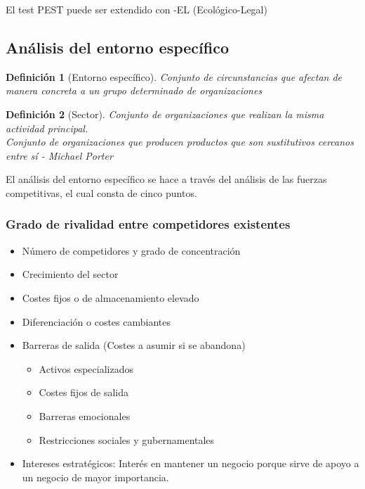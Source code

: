 \documentclass[12pt]{article}
\theoremstyle{definition_wo_parentheses}
\newtheorem{definicion}{Definición}[section]
\begin{document}
El test PEST puede ser extendido con -EL (Ecológico-Legal)

\subsection{Análisis del entorno específico}

\begin{definicion}[Entorno específico]
	Conjunto de circunstancias que afectan de manera concreta a un grupo determinado de organizaciones
\end{definicion}

\begin{definicion}[Sector]
	Conjunto de organizaciones que realizan la misma actividad principal.\\
	Conjunto de organizaciones que producen productos que son sustitutivos cercanos entre sí - \textit{Michael Porter}
\end{definicion}

El análisis del entorno específico se hace a través del análisis de las fuerzas competitivas, el cual consta de cinco puntos.

\subsubsection{Grado de rivalidad entre competidores existentes}

\begin{itemize}
\item Número de competidores y grado de concentración
\item Crecimiento del sector
\item Costes fijos o de almacenamiento elevado
\item Diferenciación o costes cambiantes
\item Barreras de salida (Costes a asumir si se abandona)
	\begin{itemize}
	\item Activos especializados
	\item Costes fijos de salida
	\item Barreras emocionales
	\item Restricciones sociales y gubernamentales
	\end{itemize}
\item Intereses estratégicos: Interés en mantener un negocio porque sirve de apoyo a un negocio de mayor importancia.

\end{itemize}
\end{document}
